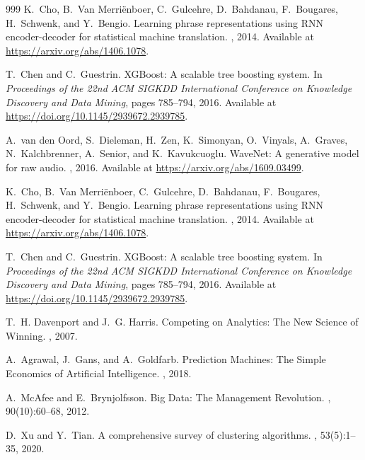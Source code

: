 \documentclass[12pt, a4paper,twoside]{report}
\theoremstyle{plain} %
\theoremstyle{definition} %
\theoremstyle{remark} %
\numberwithin{equation}{chapter}
\begin{document}
\begin{thebibliography}{999}
K.~Cho, B.~Van Merriënboer, C.~Gulcehre, D.~Bahdanau, F.~Bougares, H.~Schwenk, and Y.~Bengio.
\newblock Learning phrase representations using RNN encoder-decoder for statistical machine translation.
, 2014.
\newblock Available at \url{https://arxiv.org/abs/1406.1078}.

T.~Chen and C.~Guestrin.
\newblock XGBoost: A scalable tree boosting system.
\newblock In {\em Proceedings of the 22nd ACM SIGKDD International Conference on Knowledge Discovery and Data Mining}, pages 785--794, 2016.
\newblock Available at \url{https://doi.org/10.1145/2939672.2939785}.


A.~van den Oord, S.~Dieleman, H.~Zen, K.~Simonyan, O.~Vinyals, A.~Graves, N.~Kalchbrenner, A.~Senior, and K.~Kavukcuoglu.
\newblock WaveNet: A generative model for raw audio.
, 2016.
\newblock Available at \url{https://arxiv.org/abs/1609.03499}.

K.~Cho, B.~Van Merriënboer, C.~Gulcehre, D.~Bahdanau, F.~Bougares, H.~Schwenk, and Y.~Bengio.
\newblock Learning phrase representations using RNN encoder-decoder for statistical machine translation.
, 2014.
\newblock Available at \url{https://arxiv.org/abs/1406.1078}.

T.~Chen and C.~Guestrin.
\newblock XGBoost: A scalable tree boosting system.
\newblock In {\em Proceedings of the 22nd ACM SIGKDD International Conference on Knowledge Discovery and Data Mining}, pages 785--794, 2016.
\newblock Available at \url{https://doi.org/10.1145/2939672.2939785}.


T.~H. Davenport and J.~G. Harris.
\newblock Competing on Analytics: The New Science of Winning.
, 2007.

A.~Agrawal, J.~Gans, and A.~Goldfarb.
\newblock Prediction Machines: The Simple Economics of Artificial Intelligence.
, 2018.

A.~McAfee and E.~Brynjolfsson.
\newblock Big Data: The Management Revolution.
, 90(10):60--68, 2012.

D.~Xu and Y.~Tian.
\newblock A comprehensive survey of clustering algorithms.
, 53(5):1--35, 2020.


\end{thebibliography}
\end{document}
